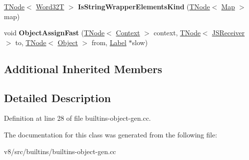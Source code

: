 \begin{DoxyCompactItemize}
\mbox{\hyperlink{classv8_1_1internal_1_1compiler_1_1TNode}{T\+Node}}$<$ \mbox{\hyperlink{structv8_1_1internal_1_1Word32T}{Word32T}} $>$ {\bfseries Is\+String\+Wrapper\+Elements\+Kind} (\mbox{\hyperlink{classv8_1_1internal_1_1compiler_1_1TNode}{T\+Node}}$<$ \mbox{\hyperlink{classv8_1_1internal_1_1Map}{Map}} $>$ map)
\item 
\mbox{\label{classv8_1_1internal_1_1ObjectBuiltinsAssembler_a0b2ecc97ae0cf45a446add76b0058986}} 
void {\bfseries Object\+Assign\+Fast} (\mbox{\hyperlink{classv8_1_1internal_1_1compiler_1_1TNode}{T\+Node}}$<$ \mbox{\hyperlink{classv8_1_1internal_1_1Context}{Context}} $>$ context, \mbox{\hyperlink{classv8_1_1internal_1_1compiler_1_1TNode}{T\+Node}}$<$ \mbox{\hyperlink{classv8_1_1internal_1_1JSReceiver}{J\+S\+Receiver}} $>$ to, \mbox{\hyperlink{classv8_1_1internal_1_1compiler_1_1TNode}{T\+Node}}$<$ \mbox{\hyperlink{classv8_1_1internal_1_1Object}{Object}} $>$ from, \mbox{\hyperlink{classv8_1_1internal_1_1compiler_1_1CodeAssemblerLabel}{Label}} $\ast$slow)
\end{DoxyCompactItemize}
\subsection*{Additional Inherited Members}


\subsection{Detailed Description}


Definition at line 28 of file builtins-\/object-\/gen.\+cc.



The documentation for this class was generated from the following file\+:\begin{DoxyCompactItemize}
\item 
v8/src/builtins/builtins-\/object-\/gen.\+cc\end{DoxyCompactItemize}
